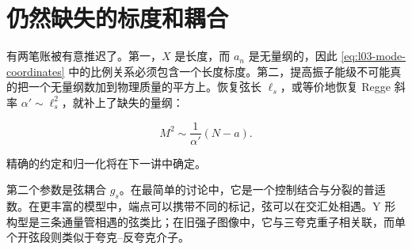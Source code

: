 \begin{classroomqa}
\end{classroomqa}

\section{仍然缺失的标度和耦合}

有两笔账被有意推迟了。第一，\(X\) 是长度，而 \(a_n\) 是无量纲的，因此 \eqref{eq:l03-mode-coordinates} 中的比例关系必须包含一个长度标度。第二，提高振子能级不可能真的把一个无量纲数加到物理质量的平方上。恢复弦长 \(\ell_s\)，或等价地恢复 Regge 斜率 \(\alpha'\sim\ell_s^2\)，就补上了缺失的量纲：

\begin{equation}
  M^2\sim\frac{1}{\alpha'}(N-a).
  \label{eq:l03-dimensional-spectrum}
\end{equation}

精确的约定和归一化将在下一讲中确定。

\begin{classroomqa}
\end{classroomqa}

第二个参数是弦耦合 \(g_s\)。在最简单的讨论中，它是一个控制结合与分裂的普适数。在更丰富的模型中，端点可以携带不同的标记，弦可以在交汇处相遇。Y 形构型是三条通量管相遇的弦类比；在旧强子图像中，它与三夸克重子相关联，而单个开弦段则类似于夸克--反夸克介子。

\begin{classroomqa}
\end{classroomqa}

\begin{classroomqa}
\end{classroomqa}

